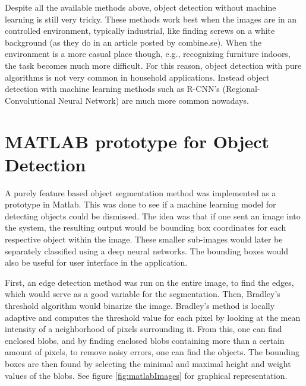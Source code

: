 Despite all the available methods above, object detection without machine learning is still very tricky. These methods work best when the images are in an controlled environment, typically industrial, like finding screws on a white background (as they do in an article posted by combine.se). \cite{combine}
When the environment is a more casual place though, e.g., recognizing furniture indoors, the task becomes much more difficult. For this reason, object detection with pure algorithms is not very common in household applications. Instead object detection with machine learning methods such as R-CNN's (Regional-Convolutional Neural Network) are much more common nowadays.

\section{MATLAB prototype for Object Detection}
\label{sec:ODmatlab}
A purely feature based object segmentation method was implemented as a prototype in Matlab. This was done to see if a machine learning model for detecting objects could be dismissed. 
The idea was that if one sent an image into the system, the resulting output would be bounding box coordinates for each respective object within the image. These smaller sub-images would later be separately classified using a deep neural networks. The bounding boxes would also be useful for user interface in the application. 

First, an edge detection method was run on the entire image, to find the edges, which would serve as a good variable for the segmentation. Then, Bradley's threshold algorithm \cite{Bradley} would binarize the image. Bradley's method is locally adaptive and computes the threshold value for each pixel by looking at the mean intensity of a neighborhood of pixels surrounding it.  From this, one can find enclosed blobs, and by finding enclosed blobs containing more than a certain amount of pixels, to remove noisy errors, one can find the objects. The bounding boxes are then found by selecting the minimal and maximal height and weight values of the blobs. See figure \ref{fig:matlabImages} for graphical representation.

